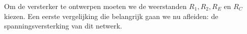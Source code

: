 \documentclass{article}
\begin{document}


				Om de versterker te ontwerpen moeten we de weerstanden $R_1,R_2,R_E$ en $R_C$ kiezen. Een eerste vergelijking die belangrijk gaan we nu afleiden: de spanningsversterking van dit netwerk.
\end{document}
